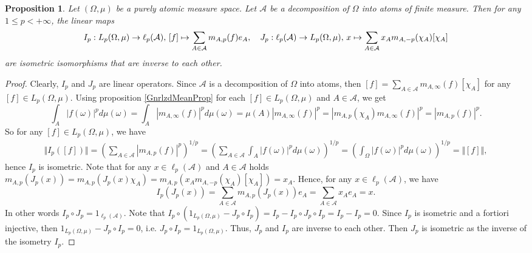 \documentclass[12pt]{article}
\newtheorem{proposition}[theorem]{Proposition}
\begin{document}
\begin{proposition}\label{LpOnPurAtomMeasSpRepr}
    Let $(\Omega,\mu)$ be a purely atomic measure space. Let $\mathcal{A}$ be a 
    decomposition of $\Omega$ into atoms of finite measure. Then for 
    any $1\leq p<+\infty$, the linear maps
    \[
        I_p:
        L_p(\Omega,\mu)\to \ell_p(\mathcal{A}),\,
        [f]\mapsto\sum_{A\in\mathcal{A}} m_{A,p}(f) e_A, 
        \quad
        J_p:
        \ell_p(\mathcal{A})\to L_p(\Omega,\mu),\,
        x\mapsto\sum_{A\in\mathcal{A}} x_A m_{A,-p}(\chi_A) [\chi_A]\\
    \]
    are isometric isomorphisms that are inverse to each other.
\end{proposition}
\begin{proof} 
    Clearly, $I_p$ and $J_p$ are linear operators.
    Since $\mathcal{A}$ is a decomposition of $\Omega$ into atoms, then
    $
        [f]=\sum_{A\in\mathcal{A}} m_{A,\infty}(f)[\chi_A]
    $
    for any $[f]\in L_p(\Omega,\mu)$. Using proposition \ref{GnrlzdMeanProp} for 
    each $[f]\in L_p(\Omega,\mu)$ and $A\in\mathcal{A}$, we get
    \[
        \int_A |f(\omega)|^pd\mu(\omega)
        =\int_A\left|m_{A,\infty}(f)\right|^pd\mu(\omega)
        =\mu(A)\left|m_{A,\infty}(f)\right|^p
        =\left|m_{A,p}(\chi_A) m_{A,\infty}(f)\right|^p
        =|m_{A,p}(f)|^p.
    \]
    So for any $[f]\in L_p(\Omega,\mu)$, we have
    \[
    \begin{aligned}
        \Vert I_p([f])\Vert
        =\left( \sum_{A\in\mathcal{A}} |m_{A,p}(f)|^p\right)^{1/p} 
        =\left( 
            \sum_{A\in\mathcal{A}} \int_A |f(\omega)|^pd\mu(\omega)
        \right)^{1/p} 
        =\left( \int_{\Omega} |f(\omega)|^pd\mu(\omega)\right)^{1/p} 
        =\Vert [f]\Vert,
    \end{aligned}
    \]
    hence $I_p$ is isometric. Note that for any $x\in\ell_p(\mathcal{A})$ 
    and $A\in\mathcal{A}$ holds
    $
        m_{A,p}(J_p(x))
        =m_{A,p}(J_p(x)\chi_A)
        =m_{A,p}(x_A m_{A,-p}(\chi_A)[\chi_A])
        =x_A.
    $
    Hence, for any $x\in\ell_p(\mathcal{A})$, we have
    \[
        I_p(J_p(x))
        =\sum_{A\in\mathcal{A}}m_{A,p}(J_p(x))e_A
        =\sum_{A\in\mathcal{A}}x_A e_A
        =x.
    \]
    In other words $I_p\circ J_p=1_{\ell_p(\mathcal{A})}$. 
    Note that 
    $
        I_p\circ(1_{L_p(\Omega,\mu)}-J_p\circ I_p)
        =I_p-I_p\circ J_p\circ I_p
        =I_p-I_p
        =0
    $. 
    Since $I_p$ is isometric and a fortiori injective, 
    then $1_{L_p(\Omega,\mu)}-J_p\circ I_p=0$, 
    i.e. $J_p\circ I_p=1_{L_p(\Omega,\mu)}$. Thus, $J_p$ and $I_p$ are inverse 
    to each other. Then $J_p$ is isometric as the inverse of the isometry $I_p$.
\end{proof}
\end{document}
